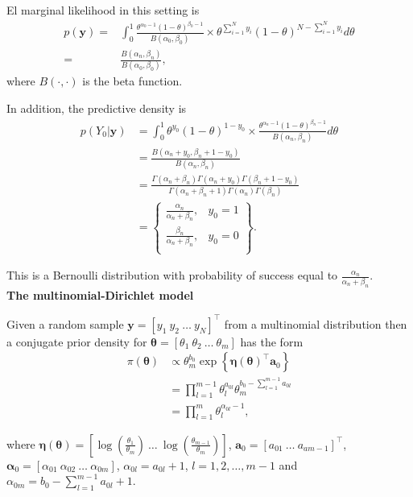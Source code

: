\begin{enumerate}
El marginal likelihood in this setting is
\begin{align}
	p(\bm{y})=&\int_{0}^1 \frac{\theta^{\alpha_0-1}(1-\theta)^{\beta_0-1}}{B(\alpha_0,\beta_0)}\times \theta^{\sum_{i=1}^N y_i}(1-\theta)^{N-\sum_{i=1}^N y_i}d\theta\nonumber\\
	=& \frac{B(\alpha_n,\beta_n)}{B(\alpha_0,\beta_0)},\nonumber
\end{align}
where $B(\cdot ,\cdot)$ is the beta function.

In addition, the predictive density is
\begin{align}
	p(Y_0|\bm{y})&=\int_0^1 \theta^{y_0}(1-\theta)^{1-y_0}\times \frac{\theta^{\alpha_n-1}(1-\theta)^{\beta_n-1}}{B(\alpha_n,\beta_n)}d\theta\nonumber\\
	&=\frac{B(\alpha_n+y_0,\beta_n+1-y_0)}{B(\alpha_n,\beta_n)}\nonumber\\
	&=\frac{\Gamma(\alpha_n+\beta_n)\Gamma(\alpha_n+y_0)\Gamma(\beta_n+1-y_0)}{\Gamma(\alpha_n+\beta_n+1)\Gamma(\alpha_n)\Gamma(\beta_n)}\nonumber\\
	&=\begin{Bmatrix}
		\frac{\alpha_n}{\alpha_n+\beta_n}, & y_0=1\\
		\frac{\beta_n}{\alpha_n+\beta_n}, & y_0=0\\
	\end{Bmatrix}.\nonumber
\end{align}

This is a Bernoulli distribution with probability of success equal to $\frac{\alpha_n}{\alpha_n+\beta_n}$.\\ 

\textbf{The multinomial-Dirichlet model}

Given a random sample $\bm{y}=[y_1 \ y_2 \ \dots \ y_N]^{\top}$ from a multinomial distribution then a conjugate prior density for $\bm{\theta}=\left[\theta_1 \ \theta_2 \ \dots \ \theta_m\right]$ has the form 
\begin{align}
	\pi(\bm{\theta})&\propto \theta_m^{b_0} \exp\left\{\bm{\eta}(\bm{\theta})^{\top}\bm{a}_0\right\}\nonumber\\
	& = \prod_{l=1}^{m-1}\theta_l^{a_{0l}}\theta_m^{b_0-\sum_{l=1}^{m-1}a_{0l}}\nonumber\\
	& = \prod_{l=1}^{m}\theta_l^{\alpha_{0l}-1},\nonumber
\end{align}

where $\bm{\eta}(\bm{\theta})=\left[\log\left(\frac{\theta_1}{\theta_m}\right) \ \dots \ \log\left(\frac{\theta_{m-1}}{\theta_m}\right)\right]$, $\bm{a}_0=\left[a_{01} \ \dots \ a_{am-1}\right]^{\top}$, $\bm{\alpha}_0=\left[\alpha_{01} \ \alpha_{02} \ \dots \ \alpha_{0m}\right]$, $\alpha_{0l}=a_{0l}+1$, $l=1,2,\dots,m-1$ and $\alpha_{0m}=b_0-\sum_{l=1}^{m-1} a_{0l}+1$. 


\end{enumerate}
